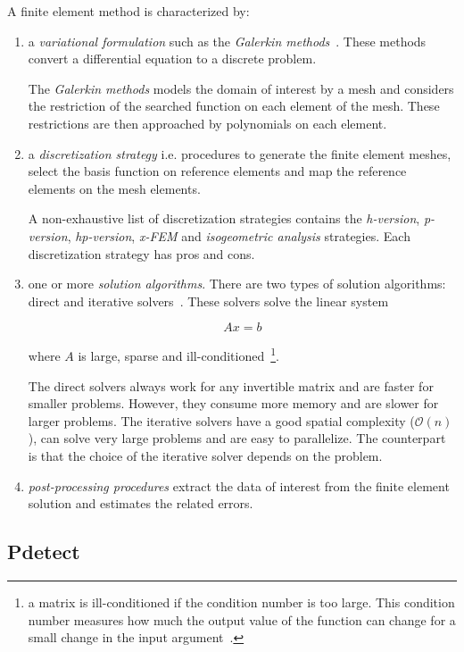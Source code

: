 \documentclass[11pt]{article}
\begin{document}
		A finite element method is characterized by:
		\begin{enumerate}
			\item a \textit{variational formulation} such as the \textit{Galerkin methods}~\cite{wiki_galerkin}.
			These methods convert a differential equation to a discrete problem.

			The \textit{Galerkin methods} models the domain of interest by a mesh and
			considers the restriction of the searched function on each element of the
			mesh. These restrictions are then approached by polynomials on each
			element.

			\item a \textit{discretization strategy} i.e. procedures to generate the
			finite element meshes, select the basis function on reference elements
			and map the reference elements on the mesh elements.

			A non-exhaustive list of discretization strategies contains the \textit{h-version},
			\textit{p-version},	\textit{hp-version}, \textit{x-FEM} and \textit{isogeometric analysis}
			strategies. Each discretization strategy has pros and cons.

			\item one or more \textit{solution algorithms}. There are two types
			of solution algorithms: direct and iterative solvers~\cite{iterative_vs_direct}.
			These solvers solve the linear system

			\[ A x =b\]

			where $A$ is large, sparse and ill-conditioned~\footnote{a matrix is
			ill-conditioned if the condition number is too large. This condition
			number measures how much the output value of the function can change for
			a small change in the input argument~\cite{wiki_cond_nbr}.}.

			The direct solvers always work for any invertible matrix and are faster
			for smaller problems. However, they consume more memory and are slower
			for larger problems. The iterative solvers have a good spatial
			complexity ($\mathcal{O}(n)$), can solve very large problems and are
			easy to parallelize. The counterpart is that the choice of the iterative
			solver depends on the problem.

			\item \textit{post-processing procedures} extract the data of interest
			from the finite element solution and estimates the related errors.
		\end{enumerate}

	\subsection{Pdetect}
\end{document}

